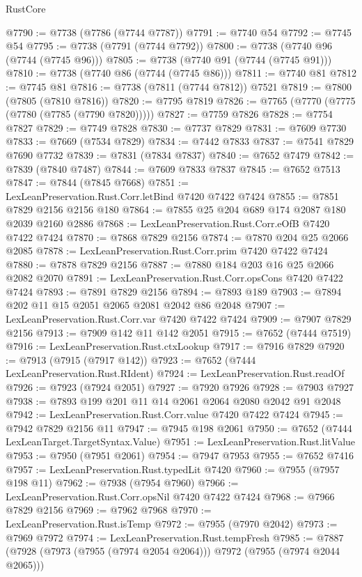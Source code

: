 \begin{lexlean}{RustCore}
\begin{coremodule}
@7790 := @7738 (@7786 (@7744 @7787))
@7791 := @7740 @54
@7792 := @7745 @54
@7795 := @7738 (@7791 (@7744 @7792))
@7800 := @7738 (@7740 @96 (@7744 (@7745 @96)))
@7805 := @7738 (@7740 @91 (@7744 (@7745 @91)))
@7810 := @7738 (@7740 @86 (@7744 (@7745 @86)))
@7811 := @7740 @81
@7812 := @7745 @81
@7816 := @7738 (@7811 (@7744 @7812)) @7521
@7819 := @7800 (@7805 (@7810 @7816))
@7820 := @7795 @7819
@7826 := @7765 (@7770 (@7775 (@7780 (@7785 (@7790 @7820)))))
@7827 := @7759 @7826
@7828 := @7754 @7827
@7829 := @7749 @7828
@7830 := @7737 @7829
@7831 := @7609 @7730
@7833 := @7669 (@7534 @7829)
@7834 := @7442 @7833
@7837 := @7541 @7829 @7690 @7732
@7839 := @7831 (@7834 @7837)
@7840 := @7652 @7479
@7842 := @7839 (@7840 @7487)
@7844 := @7609 @7833 @7837
@7845 := @7652 @7513
@7847 := @7844 (@7845 @7668)
@7851 := LexLeanPreservation.Rust.Corr.letBind @7420 @7422 @7424
@7855 := @7851 @7829 @2156 @2156 @180
@7864 := @7855 @25 @204 @689 @174 @2087 @180 @2039 @2160 @2886
@7868 := LexLeanPreservation.Rust.Corr.eOfB @7420 @7422 @7424
@7870 := @7868 @7829 @2156
@7874 := @7870 @204 @25 @2066 @2085
@7878 := LexLeanPreservation.Rust.Corr.prim @7420 @7422 @7424
@7880 := @7878 @7829 @2156
@7887 := @7880 @184 @203 @16 @25 @2066 @2082 @2070
@7891 := LexLeanPreservation.Rust.Corr.opsCons @7420 @7422 @7424
@7893 := @7891 @7829 @2156
@7894 := @7893 @189
@7903 := @7894 @202 @11 @15 @2051 @2065 @2081 @2042 @86 @2048
@7907 := LexLeanPreservation.Rust.Corr.var @7420 @7422 @7424
@7909 := @7907 @7829 @2156
@7913 := @7909 @142 @11 @142 @2051
@7915 := @7652 (@7444 @7519)
@7916 := LexLeanPreservation.Rust.ctxLookup
@7917 := @7916 @7829
@7920 := @7913 (@7915 (@7917 @142))
@7923 := @7652 (@7444 LexLeanPreservation.Rust.RIdent)
@7924 := LexLeanPreservation.Rust.readOf
@7926 := @7923 (@7924 @2051)
@7927 := @7920 @7926
@7928 := @7903 @7927
@7938 := @7893 @199 @201 @11 @14 @2061 @2064 @2080 @2042 @91 @2048
@7942 := LexLeanPreservation.Rust.Corr.value @7420 @7422 @7424
@7945 := @7942 @7829 @2156 @11
@7947 := @7945 @198 @2061
@7950 := @7652 (@7444 LexLeanTarget.TargetSyntax.Value)
@7951 := LexLeanPreservation.Rust.litValue
@7953 := @7950 (@7951 @2061)
@7954 := @7947 @7953
@7955 := @7652 @7416
@7957 := LexLeanPreservation.Rust.typedLit @7420
@7960 := @7955 (@7957 @198 @11)
@7962 := @7938 (@7954 @7960)
@7966 := LexLeanPreservation.Rust.Corr.opsNil @7420 @7422 @7424
@7968 := @7966 @7829 @2156
@7969 := @7962 @7968
@7970 := LexLeanPreservation.Rust.isTemp
@7972 := @7955 (@7970 @2042)
@7973 := @7969 @7972
@7974 := LexLeanPreservation.Rust.tempFresh
@7985 := @7887 (@7928 (@7973 (@7955 (@7974 @2054 @2064))) @7972 (@7955 (@7974 @2044 @2065)))

\end{coremodule}
\end{lexlean}
